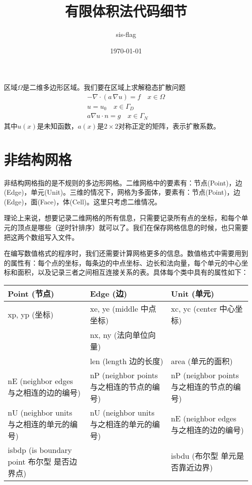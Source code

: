 \documentclass[12pt,a4paper]{article}
\title{有限体积法代码细节}
\author{sis-flag}
\date{\today}
\begin{document}
\maketitle

区域$\Omega$是二维多边形区域。我们要在区域上求解稳态扩散问题
\begin{align*}
- \nabla \cdot (a \, \nabla u) = f \quad x \in \Omega \\
u = u_0 \quad x \in \Gamma_D \\
a \nabla u \cdot n = g \quad x \in \Gamma_N
\end{align*}
其中$u(x)$是未知函数，$a(x)$是$2 \times 2$对称正定的矩阵，表示扩散系数。

\section*{非结构网格}

非结构网格指的是不规则的多边形网格。二维网格中的要素有：节点(Point)，边(Edge)，单元(Unit)。三维的情况下，网格为多面体，要素有：节点(Point)，边(Edge)，面(Face)，体(Cell)。这里只考虑二维情况。

理论上来说，想要记录二维网格的所有信息，只需要记录所有点的坐标，和每个单元的顶点是哪些（逆时针排序）就可以了。我们在保存网格信息的时候，也只需要把这两个数组写入文件。

在编写数值格式的程序时，我们还需要计算网格更多的信息。数值格式中需要用到的属性有：每个点的坐标，每条边的中点坐标、边长和法向量，每个单元的中心坐标和面积，以及记录三者之间相互连接关系的表。具体每个类中具有的属性如下：

\begin{tabular}{p{}p{}p{}}
\hline
 Point (节点) & Edge (边) & Unit (单元) \\
\hline
xp, yp (坐标) & xe, ye (middle 中点坐标) & xc, yc (center 中心坐标) \\
 & nx, ny (法向单位向量) & \\
 & len (length 边的长度) & area (单元的面积) \\
nE (neighbor edges 与之相连的边的编号) & nP (neighbor points 与之相连的节点的编号) & nP (neighbor points 与之相连的节点的编号) \\
nU (neighbor units 与之相连的单元的编号) & nU (neighbor units 与之相连的单元的编号) & nE (neighbor edges 与之相连的边的编号) \\
isbdp (is boundary point 布尔型 是否边界点) & & isbdu (布尔型 单元是否靠近边界) \\
\hline
\end{tabular}
\end{document}
